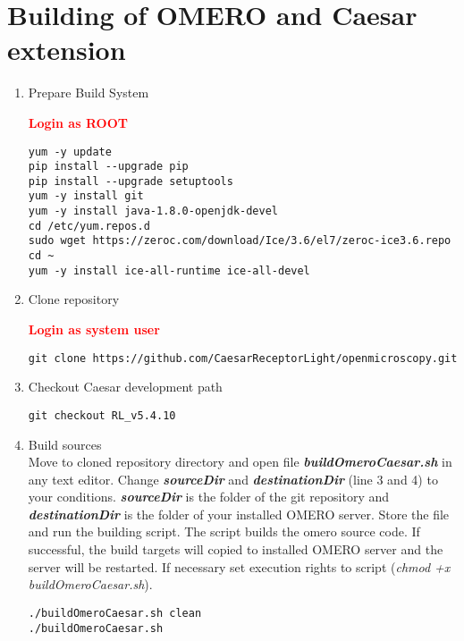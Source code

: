\documentclass[a4paper,12pt,english]{article}
\begin{document}
\section{Building of OMERO and Caesar extension}

\begin{enumerate}

\item Prepare Build System

\textcolor{red}{\textbf{Login as ROOT}}

\begin{lstlisting}
yum -y update
pip install --upgrade pip
pip install --upgrade setuptools
yum -y install git
yum -y install java-1.8.0-openjdk-devel
cd /etc/yum.repos.d
sudo wget https://zeroc.com/download/Ice/3.6/el7/zeroc-ice3.6.repo
cd ~
yum -y install ice-all-runtime ice-all-devel
\end{lstlisting}

\item Clone repository

\textcolor{red}{\textbf{Login as system user}}

\begin{lstlisting}
git clone https://github.com/CaesarReceptorLight/openmicroscopy.git
\end{lstlisting}

\item Checkout Caesar development path

\begin{lstlisting}
git checkout RL_v5.4.10
\end{lstlisting}

\item Build sources\\

Move to cloned repository directory and open file \textbf{\textit{buildOmeroCaesar.sh}} in any text editor. Change \textbf{\textit{sourceDir}} and \textbf{\textit{destinationDir}} (line 3 and 4) to your conditions. \textbf{\textit{sourceDir}} is the folder of the git repository and \textbf{\textit{destinationDir}} is the folder of your installed OMERO server. Store the file and run the building script. The script builds the omero source code. If successful, the build targets will copied to installed OMERO server and the server will be restarted. If necessary set execution rights to script (\textit{chmod +x buildOmeroCaesar.sh}).

\begin{lstlisting}
./buildOmeroCaesar.sh clean
./buildOmeroCaesar.sh
\end{lstlisting}

\end{enumerate}
\end{document}
